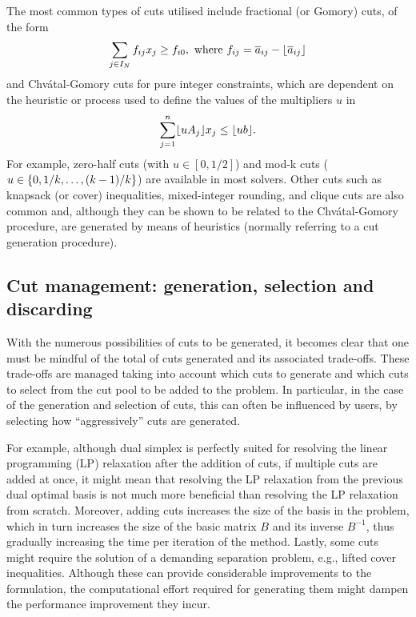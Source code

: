 The most common types of cuts utilised include fractional (or Gomory) cuts, of the form
%
\begin{equation*}
	\sum_{j \in I_N} f_{ij}x_j \geq f_{i0}, \text{ where } f_{ij} = \overline{a}_{ij} - \lfloor \overline{a}_{ij} \rfloor
\end{equation*}
%
and Chv\'atal-Gomory cuts for pure integer constraints, which are dependent on the heuristic or process used to define the values of the multipliers $u$ in
% 
\begin{equation*}
	\sum_{j=1}^n  \lfloor uA_j \rfloor x_j \leq \lfloor ub \rfloor.
\end{equation*} 
%
For example, zero-half cuts (with $u \in [0,1/2]$) and mod-k cuts ($u \in \left\{ 0, 1/k, \dots, (k-1)/k \right \}$) are available in most solvers. Other cuts such as knapsack (or cover) inequalities, mixed-integer rounding, and clique cuts are also common and, although they can be shown to be related to the Chv\'atal-Gomory procedure, are generated by means of heuristics (normally referring to a cut generation procedure).


\subsection{Cut management: generation, selection and discarding}

With the numerous possibilities of cuts to be generated, it becomes clear that one must be mindful of the total of cuts generated and its associated trade-offs. These trade-offs are managed taking into account which cuts to generate and which cuts to select from the cut pool to be added to the problem. In particular, in the case of the generation and selection of cuts, this can often be influenced by users, by selecting how ``aggressively'' cuts are generated.

For example, although dual simplex is perfectly suited for resolving the linear programming (LP) relaxation after the addition of cuts, if multiple cuts are added at once, it might mean that resolving the LP relaxation from the previous dual optimal basis is not much more beneficial than resolving the LP relaxation from scratch. Moreover, adding cuts increases the size of the basis in the problem, which in turn increases the size of the basic matrix $B$ and its inverse $B^{-1}$, thus gradually increasing the time per iteration of the method. Lastly, some cuts might require the solution of a demanding separation problem, e.g., lifted cover inequalities. Although these can provide considerable improvements to the formulation, the computational effort required for generating them might dampen the performance improvement they incur.

